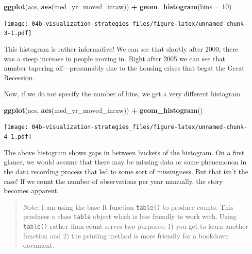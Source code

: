 \documentclass[
]{book}
\newenvironment{Shaded}{\begin{snugshade}}{\end{snugshade}}
\newcommand{\DataTypeTok}[1]{\textcolor[rgb]{0.13,0.29,0.53}{#1}}
\newcommand{\DecValTok}[1]{\textcolor[rgb]{0.00,0.00,0.81}{#1}}
\newcommand{\KeywordTok}[1]{\textcolor[rgb]{0.13,0.29,0.53}{\textbf{#1}}}
\newcommand{\NormalTok}[1]{#1}
\newcommand{\OperatorTok}[1]{\textcolor[rgb]{0.81,0.36,0.00}{\textbf{#1}}}
\newcommand{\StringTok}[1]{\textcolor[rgb]{0.31,0.60,0.02}{#1}}
\begin{document}
\begin{Shaded}
\begin{Highlighting}[]
\KeywordTok{ggplot}\NormalTok{(acs, }\KeywordTok{aes}\NormalTok{(med\_yr\_moved\_inraw)) }\OperatorTok{+}
\StringTok{  }\KeywordTok{geom\_histogram}\NormalTok{(}\DataTypeTok{bins =} \DecValTok{10}\NormalTok{)}
\end{Highlighting}
\end{Shaded}

\texttt{[image: 04b-visualization-strategies\_files/figure-latex/unnamed-chunk-3-1.pdf]}

This histogram is rather informative! We can see that shortly after 2000, there was a steep increase in people moving in. Right after 2005 we can see that number tapering off---presumably due to the housing crises that begat the Great Recession.

Now, if we do not specify the number of bins, we get a very different histogram.

\begin{Shaded}
\begin{Highlighting}[]
\KeywordTok{ggplot}\NormalTok{(acs, }\KeywordTok{aes}\NormalTok{(med\_yr\_moved\_inraw)) }\OperatorTok{+}
\StringTok{  }\KeywordTok{geom\_histogram}\NormalTok{()}
\end{Highlighting}
\end{Shaded}

\texttt{[image: 04b-visualization-strategies\_files/figure-latex/unnamed-chunk-4-1.pdf]}

The above histogram shows gaps in between buckets of the histogram. On a first glance, we would assume that there may be missing data or some phenemonon in the data recording process that led to some sort of missingness. But that isn't the case! If we count the number of observations per year manually, the story becomes apparent.

\begin{quote}
Note: I am using the base R function \texttt{table()} to produce counts. This produces a class \texttt{table} object which is less friendly to work with. Using \texttt{table()} rather than count serves two purposes: 1) you get to learn another function and 2) the printing method is more friendly for a bookdown document.
\end{quote}
\end{document}
